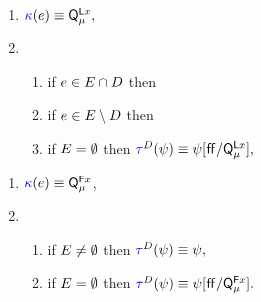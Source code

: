 \begin{enumerate}[topsep=0pt,label=(\textsc{r}\arabic*),ref=\textsc{r}\arabic*]
  \setcounter{enumi}{\value{Bkappa}}
\item \label{read-kappa-q}
  \begin{math}
    {\color{blue}\kappa}(e) \mathrel{\equiv} \smash{\mathsf{Q}_{\mu}^{\mathsf{L}x}},
  \end{math}
\item[] 
  \begin{enumerate}[leftmargin=0pt]
  \item \label{read-tau-dep-q}
    if $e\in E\cap D$ then
    \makebox[0pt][l]{\begin{math}
        \aTr{\bEvs}{\bForm} \riff
        \aVal{=}\aReg
        \limplies \bForm,
      \end{math}}
  \item \label{read-tau-ind-q}
    if $e\in E\setminus D$ then
    \makebox[0pt][l]{\begin{math}
        \aTr{\bEvs}{\bForm} \riff
        \PBR{\aVal{=}\aReg \lor \aLoc{=}\aReg}
        \limplies \bForm [\FALSE/\QL{\aLoc}{\amode}],
      \end{math}}
  \item \label{read-tau-empty-q}
    if $E=\emptyset$ then
    \begin{math}
      \aTr{\bEvs}{\bForm} \riff
      \bForm [\FALSE/\QL{\aLoc}{\amode}],
    \end{math}
  \end{enumerate}
\end{enumerate}    
\begin{enumerate}[topsep=0pt,label=(\textsc{f}\arabic*),ref=\textsc{f}\arabic*]
  \setcounter{enumi}{\value{Bkappa}}
\item \label{fence-kappa-q}
  ${\color{blue}\kappa}(e) \mathrel{\equiv} \smash{\mathsf{Q}_{\mu}^{\mathsf{F}x}}$,
\item[] 
  \begin{enumerate}[leftmargin=0pt]
  \item \label{fence-tau-dep-q}
    if $E\neq\emptyset$ then
    \begin{math}
      \aTr{\bEvs}{\bForm} \riff
      \bForm,
    \end{math}
  \item \label{fence-tau-ind-q}
    if $E=\emptyset$ then
    \begin{math}
      \aTr{\bEvs}{\bForm} \riff
      \bForm [\FALSE/\QF{\aLoc}{\amode}].
    \end{math}
  \end{enumerate}
\end{enumerate}
  
